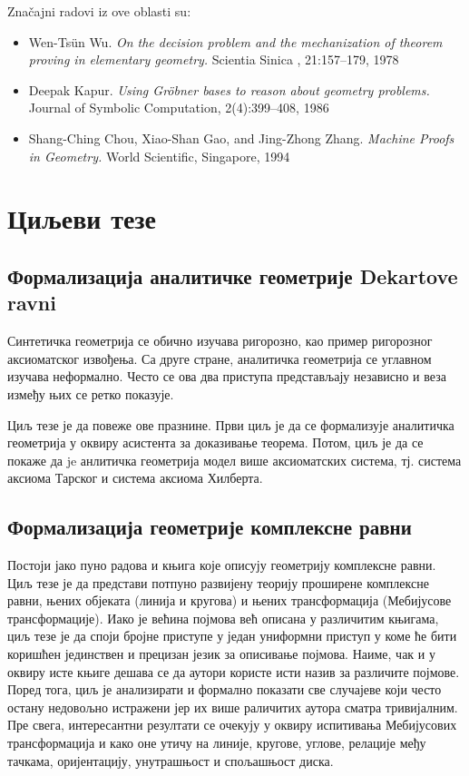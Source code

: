 \documentclass{article}
\begin{document}
Zna\v cajni radovi iz ove oblasti su:
\begin{itemize}
\item {\lat Wen-Ts\"un Wu.  {\em On the decision problem and the  mechanization  of  theorem  proving  in  elementary  geometry.}
Scientia  Sinica ,  21:157--179, 1978}

\item {\lat Deepak Kapur. {\em Using Gr\"obner bases to reason about geometry problems.} Journal of Symbolic Computation, 2(4):399--408, 1986}

\item {\lat  Shang-Ching Chou, Xiao-Shan Gao, and Jing-Zhong  Zhang. {\em Machine  Proofs  in  Geometry.} World Scientific, Singapore, 1994}
\end{itemize}

\section{Циљеви тезе}

\subsection{Формализација аналитичке геометрије Dekartove ravni}

Синтетичка геометрија се обично изучава ригорозно, као пример
ригорозног аксиоматског извођења. Са друге стране, аналитичка
геометрија се углавном изучава неформално. Често се ова два приступа
представљају независно и веза између њих се ретко показује.

Циљ тезе је да повеже ове празнине. Први циљ је да се формализује
аналитичка геометрија у оквиру асистента за доказивање теорема.
Потом, циљ је да се покаже да je анлитичка геометрија модел више
аксиоматских система, тј. система аксиома Тарског и система аксиома
Хилберта.

\subsection{Формализација геометрије комплексне равни}

Постоји јако пуно радова и књига које описују геометрију
комплексне равни. Циљ 
тезе је да представи потпуно развијену теорију проширене 
комплексне равни, њених објеката (линија и кругова) и
њених трансформација (Мебијусове трансформације). Иако је већина 
појмова већ описана у различитим књигама, циљ тезе је да 
споји бројне приступе у један униформни приступ у коме ће бити коришћен
јединствен и прецизан језик за описивање појмова. 
Наиме, чак и у оквиру исте књиге
дешава се да аутори користе исти назив за различите појмове. 
Поред тога, циљ је анализирати и формално показати све случајеве
који често остану недовољно истражени јер их више раличитих аутора 
сматра тривијалним. Пре свега, интересантни резултати се очекују 
у оквиру испитивања Мебијусових трансформација и како оне утичу на
линије, кругове, углове, релације међу тачкама, оријентацију, 
унутрашњост и спољашњост диска.
\end{document}

